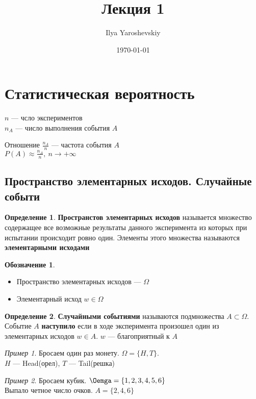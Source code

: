 \documentclass[english]{article}
\author{Ilya Yaroshevskiy}
\date{\today}
\title{Лекция 1}
\theoremstyle{plain}
\theoremstyle{remark}
\newtheorem*{examp}{Пример}
\theoremstyle{definition}
\newtheorem*{definition}{Определение}
\newtheorem*{symb}{Обозначение}
\begin{document}
\maketitle
\tableofcontents


\section{Статистическая вероятность}
\label{sec:org4bbf610}
\(n\) --- чсло экспериментов \\
\(n_A\) --- число выполнения события \(A\)
\begin{defintion}
Отношение \(\frac{n_A}{n}\) --- частота события \(A\) \\
\(P(A) \approx \frac{n_A}{n},\ n\to+\infty\)
\end{defintion}
\subsection{Пространство элементарных исходов. Случайные событи}
\label{sec:org6935f2d}
\begin{definition}
\textbf{Пространстов элементарных исходов} называется множество
содержащее все возможные результаты данного эксперимента из которых при
испытании происходит ровно один. Элементы этого множества называются \textbf{элементарными исходами}
\end{definition}
\begin{symb}
\-
\begin{itemize}
\item Пространство элементарных исходов --- \(\Omega\)
\item Элементарный исход \(w \in \Omega\)
\end{itemize}
\end{symb}
\begin{definition}
\textbf{Случайными событиями} называются подмножества \(A \subset \Omega\). Событие \(A\) \textbf{наступило} если в ходе эксперимента
произошел один из элементарных исходов \(w \in A\). \(w\) --- благоприятный к \(A\)
\end{definition}
\begin{examp}
Бросаем один раз монету. \(\Omega = \{H, T\}\). \\
\color{gray}
\(H\) --- Head(орел), \(T\) --- Tail(решка)
\end{examp}
\begin{examp}
Бросаем кубик. \(\Oemga = \{1, 2, 3, 4, 5, 6\}\) \\
Выпало четное число очков. \(A = \{2, 4, 6\}\)
\end{examp}
\end{document}
